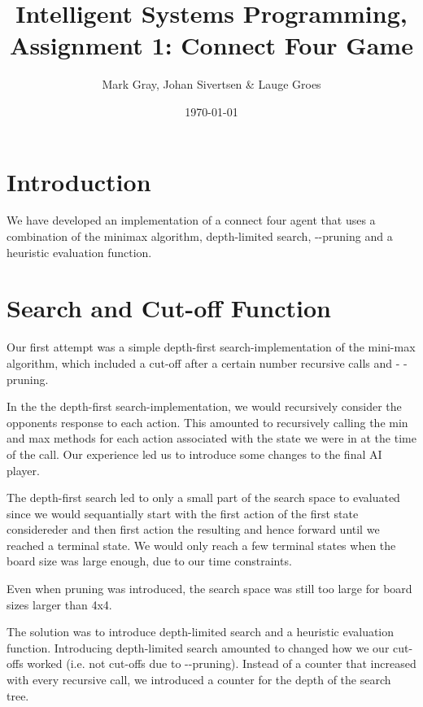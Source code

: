 \documentclass[11pt, a4paper]{article}
\author{Mark Gray, Johan Sivertsen \& Lauge Groes}
\title{Intelligent Systems Programming, Assignment 1: Connect Four Game}
\date{\today}
\begin{document}
\maketitle
\newpage
\section*{Introduction}


We have developed an implementation of a connect four agent that uses a
combination of the minimax algorithm, depth-limited search,
\alpha-\beta-pruning and a heuristic evaluation function.

\section*{Search and Cut-off Function}
Our first attempt was a simple depth-first search-implementation of the
mini-max algorithm, which included a cut-off after a certain number recursive
calls and \alpha - \beta-pruning. 

In the the depth-first search-implementation, we would recursively consider the
opponents response to each action. This amounted to recursively calling the min
and max methods for each action associated with the state we were in at the time
of the call. Our experience led us to introduce some changes to the final AI
player.

The depth-first search led to only a small part of the search space to
evaluated since we would sequantially start with the first action of the first
state considereder and then first action the resulting and hence forward until
we reached a terminal state. We would only reach a few terminal states when the
board size was large enough, due to our time constraints.

Even when \alpha\-\beta\-pruning was introduced, the search space was still too
large for board sizes larger than 4x4. 

The solution was to introduce depth-limited search and a heuristic evaluation
function. Introducing depth-limited search amounted to changed how we our
cut-offs worked (i.e. not cut-offs due to \alpha-\beta-pruning). Instead of a
counter that increased with every recursive call, we introduced a counter for
the depth of the search tree.
\end{document}
